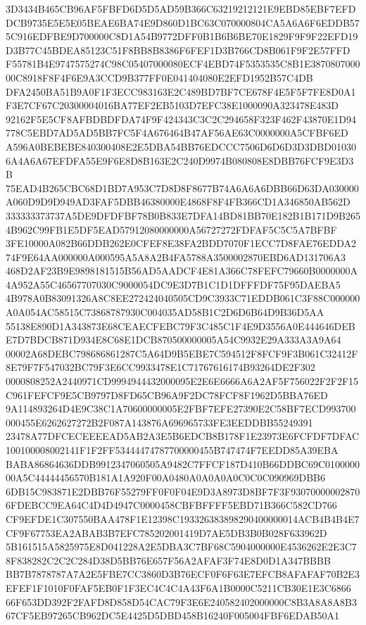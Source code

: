 \documentclass[UTF8,fontset=fandol,zihao=-4,a4paper]{ctexart}
\begin{document}
{{3D3434B465CB96AF5FBFD6D5D5AD59B366C63219212121E9EBD85EBF7EFDDCB9735E5E5E05BEAE6BA74E9D860D1BC63C070000804CA5A6A6F6EDDB57
5C916EDFBE9D700000C8D1A54B9772DFF0B1B6B6BE70E1829F9F9F22EFD19D3B77C45BDEA85123C51F8BB8B8386F6FEF1D3B766CD8B061F9F2E57FFD
F55781B4E9747575274C98C05407000080ECF4EBD74F5353535C8B1E387080700000C8918F8F4F6E9A3CCD9B377FF0E041404080E2EFD1952B57C4DB
DFA2450BA51B9A0F1F3ECC983163E2C489BD7BF7CE678F4E5F5F7FE8D0A1F3E7CF67C20300004016BA77EF2EB5103D7EFC38E1000090A323478E483D
92162F5E5CF8AFBDBDFDA74F9F424343C3C2C294658F323F462F43870E1D94778C5EBD7AD5AD5BB7FC5F4A676464B47AF56AE63C0000000A5CFBF6ED
A596A0BEBEBE840300408E2E5DBA54BB76EDCCC7506D6D6D3D3DBD010306A4A6A67EFDFA55E9F6E8D8B163E2C240D9974B080808E8DBB76FCF9E3D3B
75EAD4B265CBC68D1BD7A953C7D8D8F8677B74A6A6A6DBB66D63DA030000A060D9D9D949AD3FAF5DBB46380000E4868F8F4FB366CD1A346850AB562D
333333373737A5DE9DFDFBF78B0B833E7DFA14BD81BB70E182B1B171D9B2654B962C99FB1E5DF5EAD57912080000000A56727272FDFAF5C5C5A7BFBF
3FE10000A082B66DDB262E0CFEF8E38FA2BDD7070F1ECC7D8FAE76EDDA274F9E64AA000000A000595A5A8A2B4FA5788A3500002870EBD6AD131706A3
468D2AF23B9E9898181515B56AD5AADCF4E81A366C78FEFC79660B0000000A4A952A55C46567707030C9000054DC9E3D7B1C1D1DFFFDF75F95DAEBA5
4B978A0B83091326A8C8EE272424040505CD9C3933C71EDDB061C3F88C000000A0A054AC58515C73868787930C004035AD58B1C2D6D6B64D9B36D5AA
55138E890D1A343873E68CEAECFEBC79F3C485C1F4E9D3556A0E444646DEBE7D7BDCB871D934E8C68E1DCB870500000005A54C9932E29A333A3A9A64
00002A68DEBC798686861287C5A64D9B5EBE7C594512F8FCF9F3B061C32412F8E79F7F547032BC79F3E6CC9933478E1C71767616174B93264DE2F302
0000808252A2440971CD9994944432000095E2E6E6666A6A2AF5F756022F2F2F15C961FEFCF9E5CB9797D8FD65CB96A9F2DC78FCF8F1962D5BBA76ED
9A114893264D4E9C38C1A70600000005E2FBF7EFE27390E2C58BF7ECD993700000455E6262627272B2F087A143876A696965733FE3EEDDBB55249391
23478A77DFCECEEEEAD5AB2A3E5B6EDCB8B178F1E23973E6FCFDF7DFAC100100008002141F1F2FF53444474787700000455B747474F7EEDD85A39EBA
BABA86864636DDB9912347060505A9482C7FFCF187D410B66DDBC69C010000000A5C44444456570B181A1A920F00A0480A0A0A0A0C0C0C090969DBB6
6DB15C983871E2DBB76F55279FF0F0F04E9D3A8973D8BF7F3F930700000028706FDEBCC9EA64C4D4D4947C0000458CBFBFFFF5EBD71B366C582CD766
CF9EFDE1C307550BAA478F1E12398C193326383898290400000014ACB4B4B4E7CF9F67753EA2ABAB3B7EFC785202001419D7AE5DB3B0B028F633962D
5B161515A5825975E8D041228A2E5DBA3C7BF68C5904000000E4536262E2E3C78F838282C2C2C284D38D5BB76E657F56A2AFAF3F74E8D0D1A347BBBB
BB7B7878787A7A2E5FBE7CC3860D3B76ECF0F6F63E7EFCB8AFAFAF70B2E3EFEF1F1010F0FAF5EB0F1F3EC4C4C4A43F6A1B0000C5211CB30E1E3C6866
66F653DD392F2FAFD8D858D54CAC79F3E6E240582402000000C8B3A8A8A8B367CF5EB97265CB962DC5E4425D5DBD458B16240F005004FBF6EDAB50A1
}}
\end{document}
